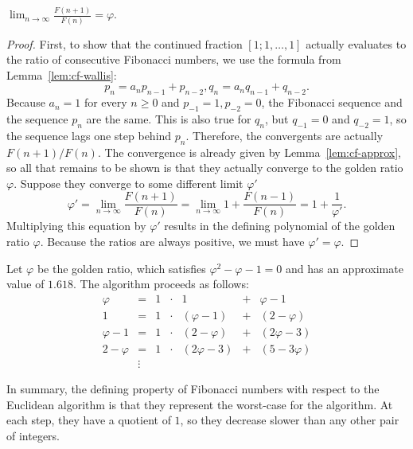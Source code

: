 \begin{theorem}
  $\lim_{n → ∞} \frac{F(n+1)}{F(n)} = φ$.
\end{theorem}

\begin{proof}
  First, to show that the continued fraction $[1; 1, …, 1]$ actually evaluates
  to the ratio of consecutive Fibonacci numbers, we use the formula from
  Lemma~\ref{lem:cf-wallis}:
  \[
    p_n = a_n p_{n-1} + p_{n-2}, q_n = a_n q_{n-1} + q_{n-2}.
  \]
  Because $a_n = 1$ for every $n ≥ 0$ and $p_{-1} = 1, p_{-2} = 0$,
  the Fibonacci sequence and the sequence $p_n$ are the same.
  This is also true for $q_n$, but $q_{-1} = 0$ and $q_{-2} = 1$, so the sequence lags one step behind $p_n$.
  Therefore, the convergents are actually $F(n+1)/F(n)$.
  The convergence is already given by Lemma~\vref{lem:cf-approx},
  so all that remains to be shown is that they actually converge to the golden ratio $φ$.
  Suppose they converge to some different limit $φ'$
  \[
    φ' = \lim_{n → ∞} \frac{F(n+1)}{F(n)} = \lim_{n → ∞} 1 + \frac{F(n-1)}{F(n)} = 1 + \frac{1}{φ'}.
  \]
  Multiplying this equation by $φ'$ results in the defining polynomial of the golden ratio $φ$.
  Because the ratios are always positive, we must have $φ' = φ$.
\end{proof}


\begin{example}
  Let $φ$ be the golden ratio,
  which satisfies $φ^2 - φ - 1 = 0$
  and has an approximate value of $1.618$.
  The algorithm proceeds as follows:
  \[
    \begin{array}{rclcrcl}
      φ & = & 1 & · & 1   & + & φ - 1 \\
         1 & = & 1 & · & (φ - 1) & + & (2 - φ) \\
       φ - 1 & = & 1 & · & (2 - φ) & + & (2φ - 3) \\
       2 - φ & = & 1 & · & (2φ - 3) & + & (5 - 3φ) \\
       & \vdots &
    \end{array}
  \]
\end{example}

In summary,
the defining property of Fibonacci numbers with respect to the Euclidean
algorithm is that they represent the worst-case for the algorithm.
At each step, they have a quotient of $1$, so they decrease slower than any other pair of integers.

